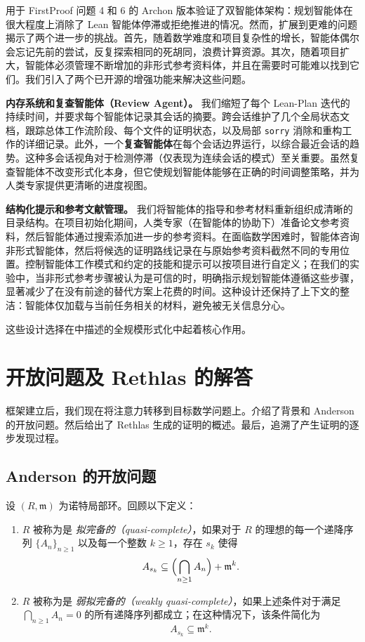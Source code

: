 ﻿\documentclass[]{pkuai4m}
\theoremstyle{plain}
\theoremstyle{definition}
\begin{document}
用于 FirstProof 问题 4 和 6 的 Archon 版本验证了双智能体架构：规划智能体在很大程度上消除了 Lean 智能体停滞或拒绝推进的情况。然而，扩展到更难的问题揭示了两个进一步的挑战。首先，随着数学难度和项目复杂性的增长，智能体偶尔会忘记先前的尝试，反复探索相同的死胡同，浪费计算资源。其次，随着项目扩大，智能体必须管理不断增加的非形式参考资料体，并且在需要时可能难以找到它们。我们引入了两个已开源的增强功能来解决这些问题。

\textbf{内存系统和复查智能体（Review Agent）。} 我们缩短了每个 Lean-Plan 迭代的持续时间，并要求每个智能体记录其会话的摘要。跨会话维护了几个全局状态文档，跟踪总体工作流阶段、每个文件的证明状态，以及局部 \texttt{sorry} 消除和重构工作的详细记录。此外，一个\textbf{复查智能体}在每个会话边界运行，以综合最近会话的趋势。这种多会话视角对于检测停滞（仅表现为连续会话的模式）至关重要。虽然复查智能体不改变形式化本身，但它使规划智能体能够在正确的时间调整策略，并为人类专家提供更清晰的进度视图。

\textbf{结构化提示和参考文献管理。} 我们将智能体的指导和参考材料重新组织成清晰的目录结构。在项目初始化期间，人类专家（在智能体的协助下）准备论文参考资料，然后智能体通过搜索添加进一步的参考资料。在面临数学困难时，智能体咨询非形式智能体，然后将候选的证明路线记录在与原始参考资料截然不同的专用位置。控制智能体工作模式和约定的技能和提示可以按项目进行自定义；在我们的实验中，当非形式参考步骤被认为是可信的时，明确指示规划智能体遵循这些步骤，显著减少了在没有前途的替代方案上花费的时间。这种设计还保持了上下文的整洁：智能体仅加载与当前任务相关的材料，避免被无关信息分心。

\medskip
\noindent 这些设计选择在中描述的全规模形式化中起着核心作用。

\section{开放问题及 Rethlas 的解答}\label{sec:rethlas_results}

框架建立后，我们现在将注意力转移到目标数学问题上。介绍了背景和 Anderson 的开放问题。然后给出了 Rethlas 生成的证明的概述。最后，追溯了产生证明的逐步发现过程。

\subsection{Anderson 的开放问题}\label{subsec:open_problem}


设 \((R, \mathfrak{m})\) 为诺特局部环。回顾以下定义：
\begin{enumerate}[leftmargin=*]
    \item $R$ 被称为是 \emph{拟完备的（quasi-complete）}，如果对于 $R$ 的理想的每一个递降序列 $\{A_n\}_{n\ge 1}$ 以及每一个整数 \(k \ge 1\)，存在 \(s_k\) 使得
    \[
    A_{s_k} \subseteq \Bigl(\bigcap_{n\ge 1} A_n\Bigr) + \mathfrak{m}^k.
    \]

    \item $R$ 被称为是 \emph{弱拟完备的（weakly quasi-complete）}，如果上述条件对于满足 \(\bigcap_{n \ge 1} A_n = 0\) 的所有递降序列都成立；在这种情况下，该条件简化为
  \[
  A_{s_k} \subseteq \mathfrak{m}^k.
  \]
\end{enumerate}
\end{document}

